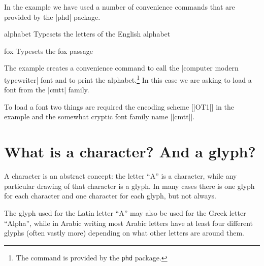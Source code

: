 
In the example we have used a number of convenience commands that are provided by the |phd| package.

\begin{docCmd} {alphabet} {}
  Typesets the letters of the English alphabet
\end{docCmd}  


\begin{docCmd}{fox}{}
  Typesets the fox passage
\end{docCmd}

The example  creates a convenience command to call the |computer modern typewriter| font and to print the alphabet.\footnote{The command  is provided by the \texttt{phd} package.} In this case we are asking \latex to load a font from the |cmtt| family. 

To load a font two things are required the encoding scheme [|OT1|] in the example and the somewhat cryptic font family name [|cmtt|].

\section{What is a character? And a glyph?}
A character is an abstract
concept: the letter “A” is a character, while any
particular drawing of that character is a glyph. In many
cases there is one glyph for each character and one character
for each glyph, but not always.

The glyph used for the Latin letter “A” may also be
used for the Greek letter “Alpha”, while in Arabic writing
most Arabic letters have at least four different glyphs
(often vastly more) depending on what other letters are
around them.

